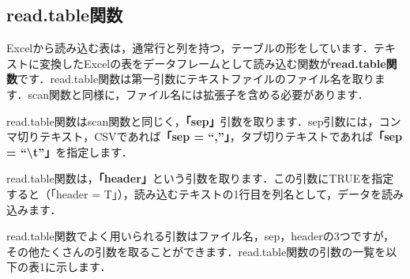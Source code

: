 \documentclass[
  letterpaper,
  DIV=11,
  numbers=noendperiod]{scrreprt}
\begin{document}
\hypertarget{read.tableux95a2ux6570}{%
\subsection{read.table関数}\label{read.tableux95a2ux6570}}

Excelから読み込む表は，通常行と列を持つ，テーブルの形をしています．テキストに変換したExcelの表をデータフレームとして読み込む関数が\textbf{read.table関数}です．read.table関数は第一引数にテキストファイルのファイル名を取ります．scan関数と同様に，ファイル名には拡張子を含める必要があります．

read.table関数はscan関数と同じく，\textbf{「sep」}引数を取ります．sep引数には，コンマ切りテキスト，CSVであれば\textbf{「sep
= ``,''」}，タブ切りテキストであれば\textbf{「sep =
``\textbackslash t''」}を指定します．

read.table関数は，\textbf{「header」}という引数を取ります．この引数にTRUEを指定すると（「header
= T」），読み込むテキストの1行目を列名として，データを読み込みます．

read.table関数でよく用いられる引数はファイル名，sep，headerの3つですが，その他たくさんの引数を取ることができます．read.table関数の引数の一覧を以下の表1に示します．
\end{document}
